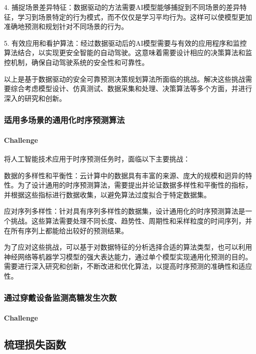 \documentclass[letterpaper,12pt]{article}
\begin{document}
	4. 捕捉场景差异特征：数据驱动的方法需要AI模型能够捕捉到不同场景的差异特征，学习到场景特定的行为模式，而不仅仅是学习平均行为。这样可以使模型更加准确地预测和规划针对不同场景的行为。
	
	5. 有效应用和看护算法：经过数据驱动后的AI模型需要与有效的应用程序和监控算法结合，以实现更安全智能的自动驾驶。这意味着需要设计相应的决策算法和监控机制，确保自动驾驶系统的安全性和可靠性。
	
	以上是基于数据驱动的安全可靠预测决策规划算法所面临的挑战。解决这些挑战需要综合考虑模型设计、仿真测试、数据采集和处理、决策算法等多个方面，并进行深入的研究和创新。
	
	\subsubsection{适用多场景的通用化时序预测算法}
	
	\paragraph{Challenge}
	
	将人工智能技术应用于时序预测任务时，面临以下主要挑战：
	
	数据的多样性和平衡性：云计算中的数据具有丰富的来源、庞大的规模和迥异的特性。为了设计通用的时序预测算法，需要提出并论证数据多样性和平衡性的指标，并根据这些指标进行数据收集，以避免算法过度拟合于特定数据集。
	
	应对序列多样性：针对具有序列多样性的数据集，设计通用化的时序预测算法是一个挑战。这些算法需要处理不同长度、趋势性、周期性和采样粒度的时间序列，并在所有序列上都能给出较好的预测结果。
	
	为了应对这些挑战，可以基于对数据特征的分析选择合适的算法类型，也可以利用神经网络等机器学习模型的强大表达能力，通过单个模型实现通用化预测的目的。需要进行深入研究和创新，不断改进和优化算法，以提高时序预测的准确性和适应性。
	
	\subsubsection{通过穿戴设备监测高糖发生次数}
	
	\paragraph{Challenge}
	
	
	
	\subsection{梳理损失函数}
	
\end{document}
